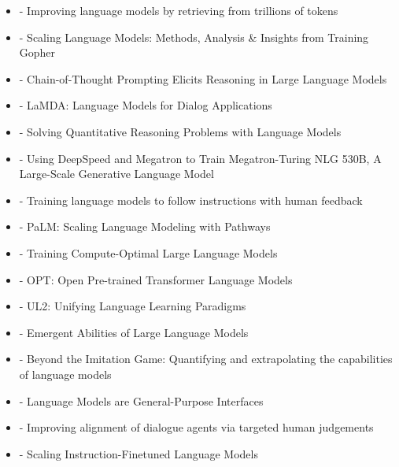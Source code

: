 \documentclass[
  letterpaper,
  DIV=11,
  numbers=noendperiod]{scrartcl}
\begin{document}
\begin{itemize}
\item
  \autocite{borgeaud2022improvinglanguagemodelsretrieving} - Improving
  language models by retrieving from trillions of tokens
\item
  \autocite{rae2022scalinglanguagemodelsmethods} - Scaling Language
  Models: Methods, Analysis \& Insights from Training Gopher
\item
  \autocite{wei2023chainofthoughtpromptingelicitsreasoning} -
  Chain-of-Thought Prompting Elicits Reasoning in Large Language Models
\item
  \autocite{thoppilan2022lamdalanguagemodelsdialog} - LaMDA: Language
  Models for Dialog Applications
\item
  \autocite{lewkowycz2022solvingquantitativereasoningproblems} - Solving
  Quantitative Reasoning Problems with Language Models
\item
  \autocite{smith2022usingdeepspeedmegatrontrain} - Using DeepSpeed and
  Megatron to Train Megatron-Turing NLG 530B, A Large-Scale Generative
  Language Model
\item
  \autocite{ouyang2022traininglanguagemodelsfollow} - Training language
  models to follow instructions with human feedback
\item
  \autocite{chowdhery2022palmscalinglanguagemodeling} - PaLM: Scaling
  Language Modeling with Pathways
\item
  \autocite{hoffmann2022trainingcomputeoptimallargelanguage} - Training
  Compute-Optimal Large Language Models
\item
  \autocite{zhang2022optopenpretrainedtransformer} - OPT: Open
  Pre-trained Transformer Language Models
\item
  \autocite{tay2023ul2unifyinglanguagelearning} - UL2: Unifying Language
  Learning Paradigms
\item
  \autocite{wei2022emergentabilitieslargelanguage} - Emergent Abilities
  of Large Language Models
\item
  \autocite{srivastava2023beyond} - Beyond the Imitation Game:
  Quantifying and extrapolating the capabilities of language models
\item
  \autocite{hao2022languagemodelsgeneralpurposeinterfaces} - Language
  Models are General-Purpose Interfaces
\item
  \autocite{glaese2022improvingalignmentdialogueagents} - Improving
  alignment of dialogue agents via targeted human judgements
\item
  \autocite{chung2022scalinginstructionfinetunedlanguagemodels} -
  Scaling Instruction-Finetuned Language Models

\end{itemize}
\end{document}
